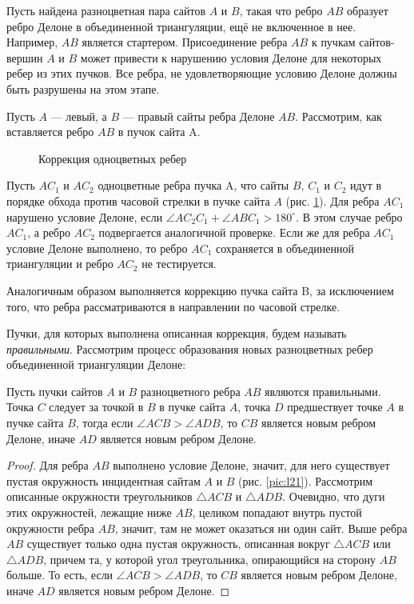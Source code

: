 \documentclass[12pt]{article}
\begin{document}
Пусть найдена разноцветная пара сайтов $A$ и $B$, такая что ребро $AB$ образует ребро Делоне в объединенной триангуляции,
ещё не включенное в нее.
Например, $AB$ является стартером.
Присоединение ребра $AB$ к пучкам сайтов-вершин $A$ и $B$ может привести к нарушению условия Делоне для некоторых ребер из этих пучков.
Все ребра, не удовлетворяющие условию Делоне должны быть разрушены на этом этапе.

Пусть $A$ --- левый, а $B$ --- правый сайты ребра Делоне $AB$.
Рассмотрим, как вставляется ребро $AB$ в пучок сайта A.

\begin{figure}[htb!]
	\caption{Коррекция одноцветных ребер}
	\label{pic:deleteWrongEdges}
\end{figure}

Пусть $AC_1$ и $AC_2$ одноцветные ребра пучка A,
что сайты $B$, $C_1$ и $C_2$ идут в порядке обхода против часовой стрелки в пучке сайта $A$ (рис. \ref{pic:deleteWrongEdges}).
Для ребра $AC_1$ нарушено условие Делоне, если $\angle AC_2C_1 + \angle ABC_1 > 180^\circ$.
В этом случае ребро $AC_1$, а ребро $AC_2$ подвергается аналогичной проверке.
Если же для ребра $AC_1$ условие Делоне выполнено, то ребро $AC_1$ сохраняется в объединенной триангуляции и ребро $AC_2$ не тестируется.

Аналогичным образом выполняется коррекцию пучка сайта B, за исключением того,
что ребра рассматриваются в направлении по часовой стрелке.

Пучки, для которых выполнена описанная коррекция, будем называть {\itshape правильными}.
Рассмотрим процесс образования новых разноцветных ребер объединенной триангуляции Делоне:

\begin{lemma}
\label{th:lem2}
Пусть пучки сайтов $A$ и $B$ разноцветного ребра $AB$ являются правильными.
Точка $C$ следует за точкой в $B$ в пучке сайта $A$, точка $D$ предшествует точке $A$ в пучке сайта $B$,
тогда если $\angle ACB > \angle ADB$, то $CB$ является новым ребром Делоне, иначе $AD$ является новым ребром Делоне.
\end{lemma}

\begin{proof}
Для ребра $AB$ выполнено условие Делоне, значит, для него существует пустая окружность инцидентная сайтам $A$ и $B$ (рис. \ref{pic:l21}).
Рассмотрим описанные окружности треугольников $\triangle ACB$ и $\triangle ADB$.
Очевидно, что дуги этих окружностей, лежащие ниже $AB$, целиком попадают внутрь пустой окружности ребра $AB$,
значит, там не может оказаться ни один сайт.
Выше ребра $AB$ существует только одна пустая окружность, описанная вокруг $\triangle ACB$ или $\triangle ADB$,
причем та, у которой угол треугольника, опирающийся на сторону $AB$ больше.
То есть, если $\angle ACB > \angle ADB$, то $CB$ является новым ребром Делоне, иначе $AD$ является новым ребром Делоне.
\end{proof}
\end{document}
